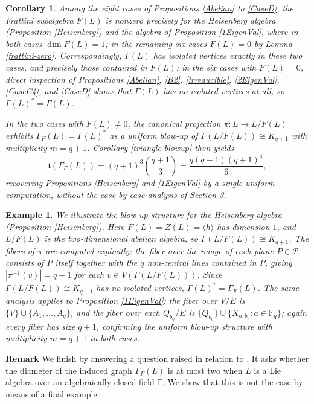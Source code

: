 \documentclass[11pt]{amsart}
\theoremstyle{plain}
\newtheorem{corollary}[theorem]{Corollary}
\newtheorem{example}[theorem]{Example}
\def\F{\mathbb{F}}
\begin{document}
\begin{corollary}\label{frattini-classification}
Among the eight cases of Propositions \ref{Abelian} to \ref{CaseD},
the Frattini subalgebra $F(L)$ is nonzero precisely for the Heisenberg algebra
(Proposition \ref{Heisenberg}) and the algebra of Proposition \ref{1EigenVal}, where in both cases $\dim F(L) = 1$; in the remaining six cases $F(L) = 0$ by Lemma \ref{frattini-zero}. 
Correspondingly, $\Gamma(L)$
has isolated vertices exactly in these two cases, and precisely those
contained in $F(L)$: in the six cases with $F(L) = 0$, direct inspection of
Propositions \ref{Abelian}, \ref{B2}, \ref{irreducible}, \ref{2EigenVal}, \ref{CaseC4}, and \ref{CaseD} shows that
$\Gamma(L)$ has no isolated vertices at all, so $\Gamma(L)^* = \Gamma(L)$.

In the two cases with $F(L) \neq 0$, the canonical projection $\pi : L \to
L/F(L)$ exhibits $\Gamma_F(L) = \Gamma(L)^*$ as a uniform blow-up of
$\Gamma(L/F(L)) \cong K_{q+1}$ with multiplicity $m = q+1$.
Corollary \ref{triangle-blowup} then yields
\[\mathfrak{t}(\Gamma_F(L)) =  (q+1)^3\binom{q+1}{3} = \frac{q(q-1)(q+1)^4}{6},\]
recovering Propositions \ref{Heisenberg} and \ref{1EigenVal}  by a
single uniform computation, without the case-by-case analysis of Section 3.
\end{corollary}

\begin{example}\label{blowup-recovers}
We illustrate the blow-up structure for the Heisenberg algebra
(Proposition \ref{Heisenberg}). Here $F(L) = Z(L) = \langle h \rangle$
has dimension $1$, and $L/F(L)$ is the two-dimensional abelian algebra, so
$\Gamma(L/F(L)) \cong K_{q+1}$. The fibers of $\pi$ are computed explicitly:
the fiber over the image of each plane $P \in \mathcal P$ consists of $P$
itself together with the $q$ non-central lines contained in $P$, giving
$|\pi^{-1}(v)| = q+1$ for each $v \in V(\Gamma(L/F(L)))$. Since
$\Gamma(L/F(L)) \cong K_{q+1}$ has no isolated vertices, $\Gamma(L)^* =
\Gamma_F(L)$. The same analysis applies to Proposition \ref{1EigenVal}:
the fiber over $V/E$ is $\{V\} \cup \{A_1,\ldots,A_q\}$, and the fiber over
each $Q_{b_0}/E$ is $\{Q_{b_0}\} \cup \{X_{a,b_0} : a \in \mathbb F_q\}$;
again every fiber has size $q+1$, confirming the uniform blow-up structure
with multiplicity $m = q+1$ in both cases.
\end{example}

{\bf Remark} We finish by answering a question raised in relation to \cite[Proposition 3.5]{TZG}. It asks whether the diameter of the induced graph $\Gamma_F(L)$ is at most two when $L$ is a Lie algebra over an algebraically closed field $\F$. We show that this is not the case by means of a final example.
\end{document}
